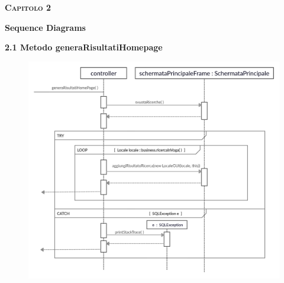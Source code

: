 \documentclass[a4paper,12pt]{article}
\begin{document}
\newpage\null{}\setcounter{page}{5}
\begin{flushleft}

\vspace*{+1cm}
\Large\textsc{\bf Capitolo 2}
\vspace*{+1cm}

\begingroup
\fontsize{35pt}{12pt}\selectfont\bf{Sequence Diagrams}
\endgroup
\vspace*{+1cm}

{\bf\normalsize 2.1 Metodo generaRisultatiHomepage }
\begin{center}
	\begin{figure}[h]
	\centering
 	\includegraphics[width=1\textwidth]{generaRisultatiHomepage.jpg}
	\end{figure}
\end{center}
\end{flushleft}
\newpage
\end{document}
